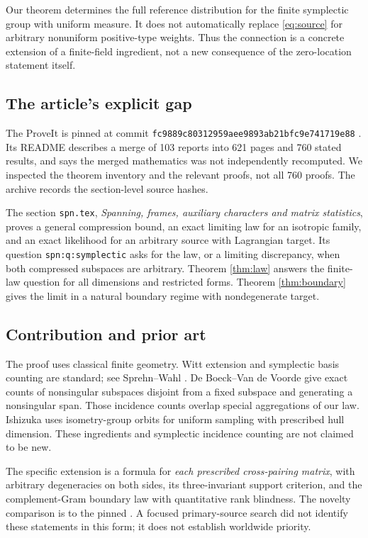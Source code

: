 Our theorem determines the full reference distribution for the finite
symplectic group with uniform measure. It does not automatically replace
\eqref{eq:source} for arbitrary nonuniform positive-type weights.
Thus the connection is a concrete extension of a finite-field ingredient,
not a new consequence of the zero-location statement itself.

\subsection{The article's explicit gap}

The ProveIt \Article{} is pinned at commit
\texttt{fc9889c80312959aee9893ab21bfc9e741719e88} \cite{Article}.
Its README describes a merge of 103 reports into 621 pages and 760 stated
results, and says the merged mathematics was not independently recomputed.
We inspected the theorem inventory and the relevant proofs, not all 760
proofs. The archive records the section-level source hashes.

The section \texttt{spn.tex}, \emph{Spanning, frames, auxiliary characters
and matrix statistics}, proves a general compression bound, an exact
limiting law for an isotropic family, and an exact likelihood for an
arbitrary source with Lagrangian target. Its question
\texttt{spn:q:symplectic} asks for the law, or a limiting discrepancy, when
both compressed subspaces are arbitrary.
Theorem \ref{thm:law} answers the finite-law question for all dimensions
and restricted forms. Theorem \ref{thm:boundary} gives the limit in a
natural boundary regime with nondegenerate target.

\subsection{Contribution and prior art}

The proof uses classical finite geometry. Witt extension and symplectic
basis counting are standard; see Sprehn--Wahl \cite{SprehnWahl}.
De Boeck--Van de Voorde \cite{DeBoeck} give exact counts of nonsingular
subspaces disjoint from a fixed subspace and generating a nonsingular
span. Those incidence counts overlap special aggregations of our law.
Ishizuka \cite{Ishizuka} uses isometry-group orbits for uniform sampling
with prescribed hull dimension. These ingredients and symplectic incidence
counting are not claimed to be new.

The specific extension is a formula for \emph{each prescribed cross-pairing
matrix}, with arbitrary degeneracies on both sides, its three-invariant
support criterion, and the complement-Gram boundary law with quantitative
rank blindness. The novelty comparison is to the pinned \Article{}.
A focused primary-source search did not identify these statements in
this form; it does not establish worldwide priority.
